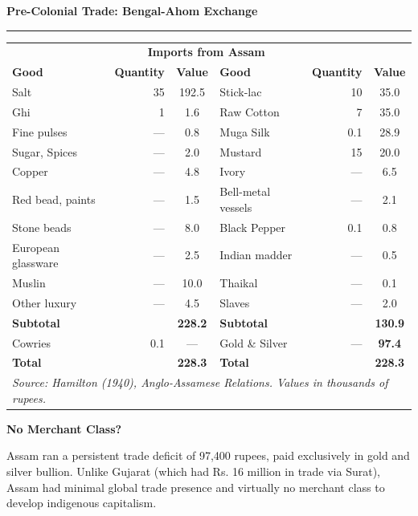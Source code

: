 \documentclass[aspectratio=169, 10pt]{beamer}
\newcommand{\slidetitle}[1]{%
  \vspace{-4pt}%
  {\usebeamerfont{frametitle}\Large\color{ink}\textbf{#1}}%
  \par\vspace{2pt}%
  {\color{clay}\rule{40pt}{2pt}}%
  \par\vspace{8pt}%
}
\newcommand{\thesisbox}[2]{%
  \begin{minipage}{\textwidth}
    {\bfseries\color{rust}#1}\par\vspace{4pt}%
    \color{ink}#2
  \end{minipage}\par
}
\begin{document}
\begin{frame}
\slidetitle{Pre-Colonial Trade: Bengal-Ahom Exchange}

\vspace{4pt}
\begin{center}
\tiny
\begin{tabular}{lrc|lrc}
\arrayrulecolor{warmgray}
\toprule
\multicolumn{3}{c|}{\textbf{\color{rust}Exports from Bengal}} & \multicolumn{3}{c}{\textbf{\color{deepgreen}Imports from Assam}} \\
\textbf{Good} & \textbf{Quantity} & \textbf{Value} & \textbf{Good} & \textbf{Quantity} & \textbf{Value} \\
\midrule
Salt & 35 & 192.5 & Stick-lac & 10 & 35.0 \\
Ghi & 1 & 1.6 & Raw Cotton & 7 & 35.0 \\
Fine pulses & --- & 0.8 & Muga Silk & 0.1 & 28.9 \\
Sugar, Spices & --- & 2.0 & Mustard & 15 & 20.0 \\
Copper & --- & 4.8 & Ivory & --- & 6.5 \\
Red bead, paints & --- & 1.5 & Bell-metal vessels & --- & 2.1 \\
Stone beads & --- & 8.0 & Black Pepper & 0.1 & 0.8 \\
European glassware & --- & 2.5 & Indian madder & --- & 0.5 \\
Muslin & --- & 10.0 & Thaikal & --- & 0.1 \\
Other luxury & --- & 4.5 & Slaves & --- & 2.0 \\
\midrule
\multicolumn{2}{l}{\textbf{Subtotal}} & \textbf{228.2} & \multicolumn{2}{l}{\textbf{Subtotal}} & \textbf{130.9} \\
Cowries & 0.1 & --- & Gold \& Silver & --- & \textbf{\color{burgundy}97.4} \\
\midrule
\multicolumn{2}{l}{\textbf{Total}} & \textbf{228.3} & \multicolumn{2}{l}{\textbf{Total}} & \textbf{228.3} \\
\bottomrule
\multicolumn{6}{l}{\tiny\textit{Source: Hamilton (1940), Anglo-Assamese Relations. Values in thousands of rupees.}} \\
\end{tabular}
\end{center}

\vspace{8pt}
\thesisbox{No Merchant Class?}{%
  Assam ran a persistent trade deficit of 97,400 rupees, paid exclusively in gold and silver bullion. Unlike Gujarat (which had Rs. 16 million in trade via Surat), Assam had minimal global trade presence and virtually no merchant class to develop indigenous capitalism.
}
\end{frame}
\end{document}
